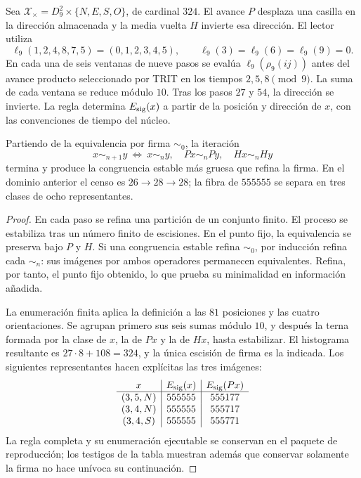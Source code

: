 \begin{definition}
\label{viii:def:firma555}
Sea \(\mathcal X_\times=D_9^2\times\{N,E,S,O\}\), de cardinal \(324\).
El avance \(P\) desplaza una casilla en la dirección almacenada y la media
vuelta \(H\) invierte esa dirección. El lector utiliza
\[
\ell_9(1,2,4,8,7,5)=(0,1,2,3,4,5),\qquad
\ell_9(3)=\ell_9(6)=\ell_9(9)=0.
\]
En cada una de seis ventanas de nueve pasos se evalúa
\(\ell_9(\rho_9(ij))\) antes del avance producto seleccionado por TRIT en
los tiempos \(2,5,8\pmod9\). La suma de cada ventana se reduce módulo
\(10\). Tras los pasos \(27\) y \(54\), la dirección se invierte.
La regla determina \(E_{\rm sig}(x)\) a partir de la posición y dirección
de \(x\), con las convenciones de tiempo del núcleo.
\end{definition}

\begin{proposition}
\label{viii:prop:firma555}
Partiendo de la equivalencia por firma \(\sim_0\), la iteración
\[
x\sim_{n+1}y\ \Longleftrightarrow\
x\sim_n y,\quad Px\sim_n Py,\quad Hx\sim_n Hy
\]
termina y produce la congruencia estable más gruesa que refina la firma.
En el dominio anterior el censo es \(26\to28\to28\); la fibra de
\(555555\) se separa en tres clases de ocho representantes.
\end{proposition}
\begin{proof}
En cada paso se refina una partición de un conjunto finito. El proceso se
estabiliza tras un número finito de escisiones. En el punto fijo, la
equivalencia se preserva bajo \(P\) y \(H\). Si una congruencia estable
refina \(\sim_0\), por inducción refina cada \(\sim_n\): sus imágenes
por ambos operadores permanecen equivalentes. Refina, por tanto, el punto
fijo obtenido, lo que prueba su minimalidad en información añadida.

La enumeración finita aplica la definición a las \(81\) posiciones y las
cuatro orientaciones. Se agrupan primero sus seis sumas módulo \(10\), y
después la terna formada por la clase de \(x\), la de \(Px\) y la de
\(Hx\), hasta estabilizar. El histograma resultante es
\(27\cdot8+108=324\), y la única escisión de firma es la indicada.
Los siguientes representantes hacen explícitas las tres imágenes:
\[
\begin{array}{c|c|c}
x&E_{\rm sig}(x)&E_{\rm sig}(Px)\\\hline
(3,5,N)&555555&555177\\
(3,4,N)&555555&555717\\
(3,4,S)&555555&555771
\end{array}
\]
La regla completa y su enumeración ejecutable se conservan en el paquete
de reproducción; los testigos de la tabla muestran además que conservar
solamente la firma no hace unívoca su continuación.
\end{proof}

